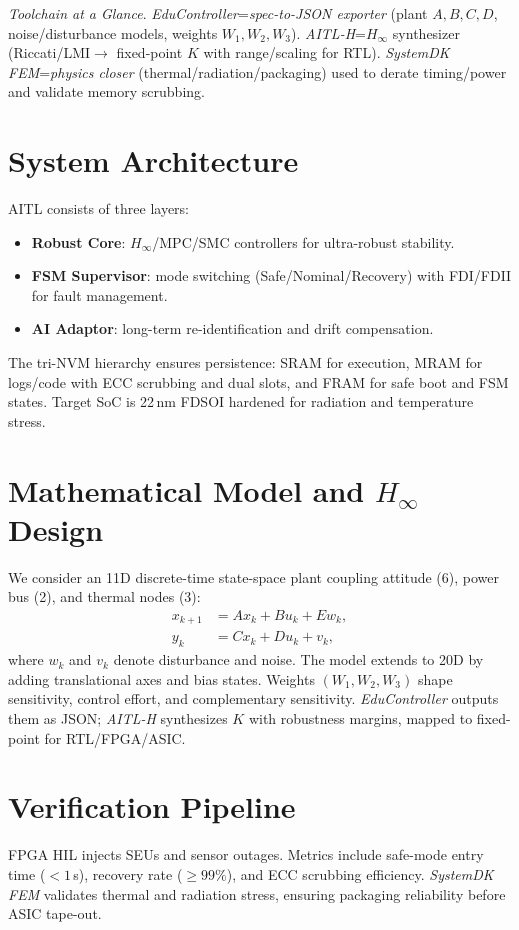 \documentclass[conference]{IEEEtran}
\begin{document}
\textit{Toolchain at a Glance}. \emph{EduController}=\textit{spec-to-JSON exporter} (plant $A,B,C,D$, noise/disturbance models, weights $W_1,W_2,W_3$). \emph{AITL-H}=$H_\infty$ synthesizer (Riccati/\!LMI$\rightarrow$ fixed-point $K$ with range/scaling for RTL). \emph{SystemDK FEM}=\textit{physics closer} (thermal/radiation/packaging) used to derate timing/power and validate memory scrubbing.

\section{System Architecture}
AITL consists of three layers:
\begin{itemize}
  \item \textbf{Robust Core}: $H_\infty$/MPC/SMC controllers for ultra-robust stability.
  \item \textbf{FSM Supervisor}: mode switching (Safe/Nominal/Recovery) with FDI/FDII for fault management.
  \item \textbf{AI Adaptor}: long-term re-identification and drift compensation.
\end{itemize}
The tri-NVM hierarchy ensures persistence: SRAM for execution, MRAM for logs/code with ECC scrubbing and dual slots, and FRAM for safe boot and FSM states. Target SoC is 22\,nm FD\!SOI hardened for radiation and temperature stress.

\section{Mathematical Model and $H_\infty$ Design}
We consider an 11D discrete-time state-space plant coupling attitude (6), power bus (2), and thermal nodes (3):
\begin{align}
  x_{k+1} &= A x_k + B u_k + E w_k, \label{eq:ss1}\\
  y_k &= C x_k + D u_k + v_k, \label{eq:ss2}
\end{align}
where $w_k$ and $v_k$ denote disturbance and noise. The model extends to 20D by adding translational axes and bias states. Weights $(W_1,W_2,W_3)$ shape sensitivity, control effort, and complementary sensitivity. \emph{EduController} outputs them as JSON; \emph{AITL-H} synthesizes $K$ with robustness margins, mapped to fixed-point for RTL/FPGA/ASIC.

\section{Verification Pipeline}
FPGA HIL injects SEUs and sensor outages. Metrics include safe-mode entry time ($<\!1$\,s), recovery rate ($\ge\!99\%$), and ECC scrubbing efficiency. \emph{SystemDK FEM} validates thermal and radiation stress, ensuring packaging reliability before ASIC tape-out.
\end{document}
